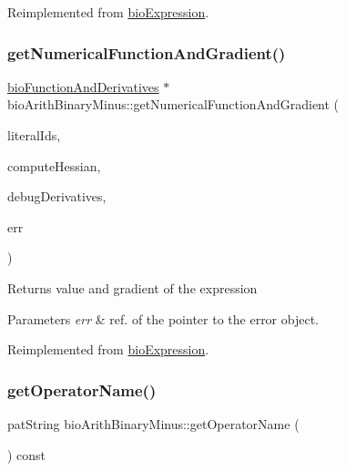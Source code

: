 Reimplemented from \hyperlink{classbio_expression_a3e4b4dca58dbbc6f0e411b30eb3f60b4}{bio\+Expression}.

\mbox{\label{classbio_arith_binary_minus_a647d9b7b5fd8d5154eeba376a11d2a27}} 
\subsubsection{\texorpdfstring{get\+Numerical\+Function\+And\+Gradient()}{getNumericalFunctionAndGradient()}}
{\footnotesize\ttfamily \hyperlink{classbio_function_and_derivatives}{bio\+Function\+And\+Derivatives} $\ast$ bio\+Arith\+Binary\+Minus\+::get\+Numerical\+Function\+And\+Gradient (\begin{DoxyParamCaption}\item[{vector$<$ pat\+U\+Long $>$}]{literal\+Ids,  }\item[{pat\+Boolean}]{compute\+Hessian,  }\item[{pat\+Boolean}]{debug\+Derivatives,  }\item[{pat\+Error $\ast$\&}]{err }\end{DoxyParamCaption})\hspace{0.3cm}{\ttfamily [virtual]}}

\begin{DoxyReturn}{Returns}
value and gradient of the expression 
\end{DoxyReturn}

\begin{DoxyParams}{Parameters}
{\em err} & ref. of the pointer to the error object. \\
\hline
\end{DoxyParams}


Reimplemented from \hyperlink{classbio_expression_a91c81ce80c9e972c913b10f5f3c1ed13}{bio\+Expression}.

\mbox{\label{classbio_arith_binary_minus_a899f710bd1ba441724b9e6d7b904aa88}} 
\subsubsection{\texorpdfstring{get\+Operator\+Name()}{getOperatorName()}}
{\footnotesize\ttfamily pat\+String bio\+Arith\+Binary\+Minus\+::get\+Operator\+Name (\begin{DoxyParamCaption}{ }\end{DoxyParamCaption}) const\hspace{0.3cm}{\ttfamily [virtual]}}

